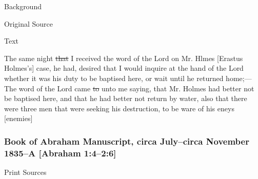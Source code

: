 			\begin{description}
				\item[Background]
			\end{description}
			
			
			\begin{description}
				\item[Original Source]
			\end{description}
			
			
			\begin{description}
				\item[Text]
			\end{description}
			
				The same night \sout{that} I received the word of the Lord on Mr. Hlmes [Erastus Holmes's] case, he had, desired that I would inquire at the hand of the Lord whether it was his duty to be baptised here, or wait until he returned home;--- The word of the Lord came \sout{to} unto me saying, that Mr. Holmes had better not be baptised here, and that he had better not return by water, also that there were three men that were seeking his destruction, to be ware of his eneys [enemies]
				
		\subsubsection{Book of Abraham Manuscript, circa July--circa November 1835--A [Abraham 1:4--2:6]}
			\label{EMS-1835-JS-CIR-JUL-CIR-NOV-1835}
			
			\begin{description}
				\item[Print Sources]
			\end{description}

